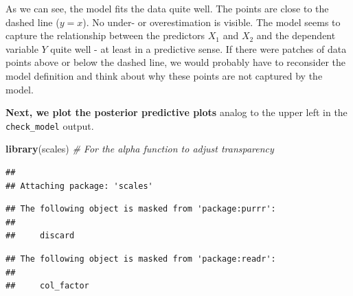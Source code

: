 \documentclass[
]{book}
\newenvironment{Shaded}{\begin{snugshade}}{\end{snugshade}}
\newcommand{\CommentTok}[1]{\textcolor[rgb]{0.56,0.35,0.01}{\textit{#1}}}
\newcommand{\FunctionTok}[1]{\textcolor[rgb]{0.13,0.29,0.53}{\textbf{#1}}}
\newcommand{\NormalTok}[1]{#1}
\begin{document}
As we can see, the model fits the data quite well. The points are close to the dashed line (\(y=x\)).
No under- or overestimation is visible. The model seems to capture the relationship between the predictors \(X_1\) and \(X_2\)
and the dependent variable \(Y\) quite well - at least in a predictive sense. If there were patches of data points above or below the dashed line,
we would probably have to reconsider the model definition and think about why these points are not captured by the model.

\textbf{Next, we plot the posterior predictive plots} analog to the upper left in the \texttt{check\_model} output.

\begin{Shaded}
\begin{Highlighting}[]
\FunctionTok{library}\NormalTok{(scales)  }\CommentTok{\# For the alpha function to adjust transparency}
\end{Highlighting}
\end{Shaded}

\begin{verbatim}
## 
## Attaching package: 'scales'
\end{verbatim}

\begin{verbatim}
## The following object is masked from 'package:purrr':
## 
##     discard
\end{verbatim}

\begin{verbatim}
## The following object is masked from 'package:readr':
## 
##     col_factor
\end{verbatim}
\end{document}

